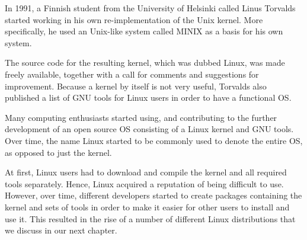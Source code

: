 In 1991, a Finnish student from the University of Helsinki called Linus Torvalds started working in his own re-implementation of the Unix kernel. More specifically, he used an Unix-like system called MINIX as a basis for his own system.

The source code for the resulting kernel, which was dubbed Linux, was made freely available, together with a call for comments and suggestions for improvement. Because a kernel by itself is not very useful, Torvalds also published a list of \acs{GNU} tools for Linux users in order to have a functional \acs{OS}.

Many computing enthusiasts started using, and contributing to the further development of an open source \acs{OS} consisting of a Linux kernel and \acs{GNU} tools. Over time, the name Linux started to be commonly used to denote the entire \acs{OS}, as opposed to just the kernel.


At first, Linux users had to download and compile the kernel and all required tools separately. Hence, Linux acquired a reputation of being difficult to use. However, over time, different developers started to create packages containing the kernel and sets of tools in order to make it easier for other users to install and use it. This resulted in the rise of a number of different Linux distributions that we discuss in our next chapter.

